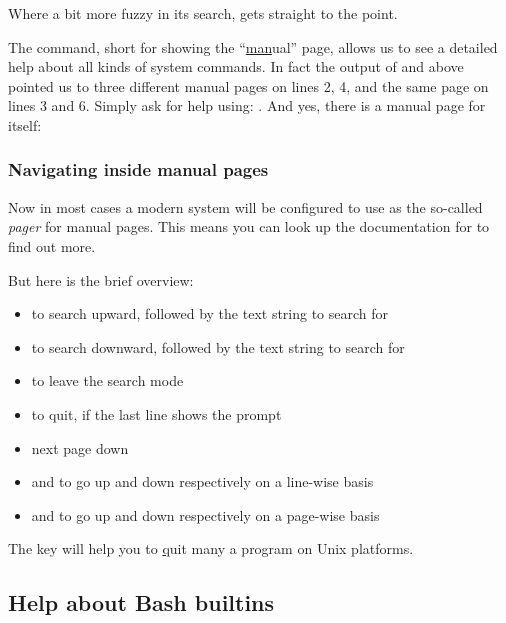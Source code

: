 \documentclass{olli-handout}
\begin{document}
Where  a bit more fuzzy in its search,  gets straight to the point.

The  command, short for showing the ``\underline{man}ual'' page, allows us to see a detailed help about all kinds of system commands. In fact the output of  and  above pointed us to three different manual pages on lines 2, 4, and the same page on lines 3 and 6. Simply ask for help using: . And yes, there is a manual page for  itself:


\subsubsection{Navigating inside manual pages}

Now in most cases a modern system will be configured to use  as the so-called \emph{pager} for manual pages. This means you can look up the documentation for  to find out more.

But here is the brief overview:

\begin{itemize}
	\item {} to search upward, followed by the text string to search for
	\item \keys{/} to search downward, followed by the text string to search for
	\item \keys{\esc} to leave the search mode
	\item {} to quit, if the last line shows the \TT{:} prompt
	\item \keys{\Space} next page down
	\item \keys{\arrowkeyup} and \keys{\arrowkeydown} to go up and down respectively on a line-wise basis
	\item {} and  to go up and down respectively on a page-wise basis
\end{itemize}

\begin{hintbox}
{\olliHandLeft} The  key will help you to \underline{q}uit many a program on Unix platforms.
\end{hintbox}

\subsection{Help about Bash builtins}
\end{document}
